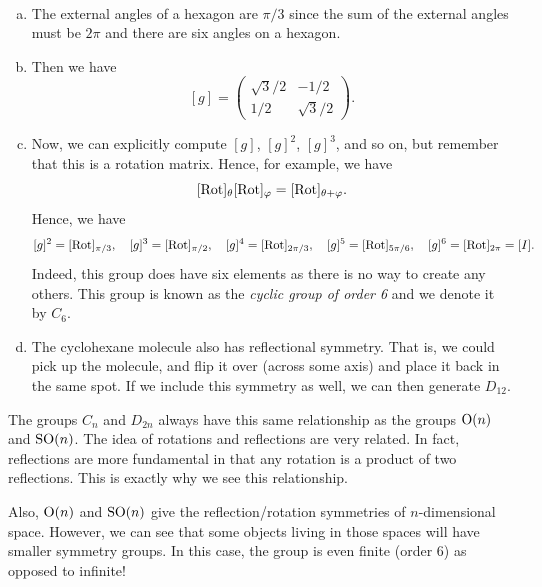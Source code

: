 \documentclass[12pt]{article} %
\begin{document}
\begin{solution}~
\begin{enumerate}[(a)]
    \item The external angles of a hexagon are $\pi/3$ since the sum of the external angles must be $2\pi$ and there are six angles on a hexagon.
    \item Then we have
    \[
    [g]=\begin{pmatrix} \sqrt{3}/2 & -1/2 \\ 1/2 & \sqrt{3}/2 \end{pmatrix}.
    \]
    \item Now, we can explicitly compute $[g]$, $[g]^2$, $[g]^3$, and so on, but remember that this is a rotation matrix.  Hence, for example, we have
    \[
    [\mathrm{Rot}]_\theta [\mathrm{Rot}]_\varphi = [\mathrm{Rot}]_{\theta+\varphi}.
    \]
    Hence, we have
    \[
    [g]^2 = [\mathrm{Rot}]_{\pi/3},\quad [g]^3 = [\mathrm{Rot}]_{\pi/2}, \quad [g]^4 = [\mathrm{Rot}]_{2\pi/3}, \quad [g]^5 = [\mathrm{Rot}]_{5\pi/6}, \quad [g]^6 = [\mathrm{Rot}]_{2\pi}=[I].
    \]
    Indeed, this group does have six elements as there is no way to create any others. This group is known as the \emph{cyclic group of order 6} and we denote it by $C_6$.
    \item The cyclohexane molecule also has reflectional symmetry. That is, we could pick up the molecule, and flip it over (across some axis) and place it back in the same spot. If we include this symmetry as well, we can then generate $D_{12}$. 
\end{enumerate}
\end{solution}

\begin{remark}
The groups $C_n$ and $D_{2n}$ always have this same relationship as the groups $\mathrm{O}(n)$ and $\mathrm{SO}(n)$. The idea of rotations and reflections are very related. In fact, reflections are more fundamental in that any rotation is a product of two reflections. This is exactly why we see this relationship.

Also, $\mathrm{O}(n)$ and $\mathrm{SO}(n)$ give the reflection/rotation symmetries of $n$-dimensional space. However, we can see that some objects living in those spaces will have smaller symmetry groups. In this case, the group is even finite (order 6) as opposed to infinite!
\end{remark}
\end{document}
